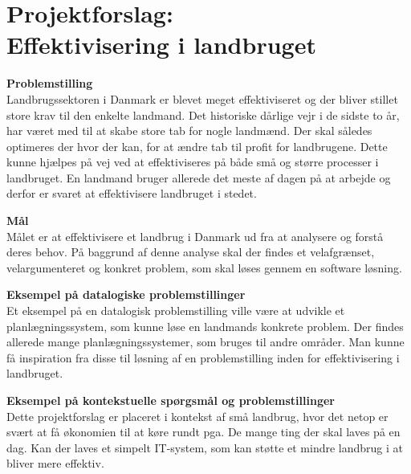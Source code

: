 \chapter{Projektforslag: \\Effektivisering i landbruget}\label{ch:appGlabel}
\textbf{Problemstilling}\\
Landbrugssektoren i Danmark er blevet meget effektiviseret og der bliver stillet store krav til den enkelte landmand. Det historiske dårlige vejr i de sidste to år, har været med til at skabe store tab for nogle landmænd. Der skal således optimeres der hvor der kan, for at ændre tab til profit for landbrugene. Dette kunne hjælpes på vej ved at effektiviseres på både små og større processer i landbruget. En landmand bruger allerede det meste af dagen på at arbejde og derfor er svaret at effektivisere landbruget i stedet.

\textbf{Mål}\\
Målet er at effektivisere et landbrug i Danmark ud fra at analysere og forstå deres behov. På baggrund af denne analyse skal der findes et velafgrænset, velargumenteret og konkret problem, som skal løses gennem en software løsning.

\textbf{Eksempel på datalogiske problemstillinger}\\
Et eksempel på en datalogisk problemstilling ville være at udvikle et planlægningssystem, som kunne løse en landmands konkrete problem. Der findes allerede mange planlægningssystemer, som bruges til andre områder. Man kunne få inspiration fra disse til løsning af en problemstilling inden for effektivisering i landbruget.  

\textbf{Eksempel på kontekstuelle spørgsmål og problemstillinger}\\
Dette projektforslag er placeret i kontekst af små landbrug, hvor det netop er svært at få økonomien til at køre rundt pga. De mange ting der skal laves på en dag. Kan der laves et simpelt IT-system, som kan støtte et mindre landbrug i at bliver mere effektiv.  


